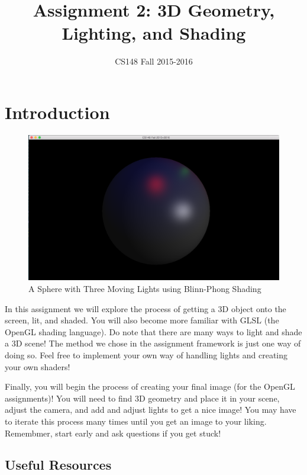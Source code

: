 \documentclass{article}
\begin{document}
\title{Assignment 2: 3D Geometry, Lighting, and Shading}
\author{CS148 Fall 2015-2016}
\date{}
\maketitle

\section*{Introduction}

\begin{figure}[h!]
    \centering\includegraphics[width=0.7\linewidth]{assign2.png}
    \caption{A Sphere with Three Moving Lights using Blinn-Phong Shading}
\end{figure}

In this assignment we will explore the process of getting a 3D object onto the screen, lit, and shaded. You will also become more familiar with GLSL (the OpenGL shading language). Do note that there are many ways to light and shade a 3D scene! The method we chose in the assignment framework is just one way of doing so. Feel free to implement your own way of handling lights and creating your own shaders!

Finally, you will begin the process of creating your final image (for the OpenGL assignments)! You will need to find 3D geometry and place it in your scene, adjust the camera, and add and adjust lights to get a nice image! You may have to iterate this process many times until you get an image to your liking. Remembmer, start early and ask questions if you get stuck!

\subsection*{Useful Resources}
\end{document}

